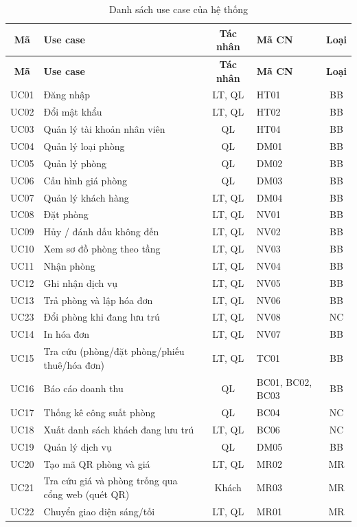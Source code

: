 \documentclass[14pt]{report}
\begin{document}
\begin{longtable}{|c|p{4.3cm}|c|l|c|}
\caption{Danh sách use case của hệ thống}\label{tab:uc-list}\\
\hline
\textbf{Mã} & \textbf{Use case} & \textbf{Tác nhân} & \textbf{Mã CN} & \textbf{Loại}\\\hline
\endfirsthead
\hline \textbf{Mã} & \textbf{Use case} & \textbf{Tác nhân} & \textbf{Mã CN} & \textbf{Loại}\\\hline
\endhead
UC01 & Đăng nhập & LT, QL & HT01 & BB \\\hline
UC02 & Đổi mật khẩu & LT, QL & HT02 & BB \\\hline
UC03 & Quản lý tài khoản nhân viên & QL & HT04 & BB \\\hline
UC04 & Quản lý loại phòng & QL & DM01 & BB \\\hline
UC05 & Quản lý phòng & QL & DM02 & BB \\\hline
UC06 & Cấu hình giá phòng & QL & DM03 & BB \\\hline
UC07 & Quản lý khách hàng & LT, QL & DM04 & BB \\\hline
UC08 & Đặt phòng & LT, QL & NV01 & BB \\\hline
UC09 & Hủy / đánh dấu không đến & LT, QL & NV02 & BB \\\hline
UC10 & Xem sơ đồ phòng theo tầng & LT, QL & NV03 & BB \\\hline
UC11 & Nhận phòng & LT, QL & NV04 & BB \\\hline
UC12 & Ghi nhận dịch vụ & LT, QL & NV05 & BB \\\hline
UC13 & Trả phòng và lập hóa đơn & LT, QL & NV06 & BB \\\hline
UC23 & Đổi phòng khi đang lưu trú & LT, QL & NV08 & NC \\\hline
UC14 & In hóa đơn & LT, QL & NV07 & BB \\\hline
UC15 & Tra cứu (phòng/đặt phòng/phiếu thuê/hóa đơn) & LT, QL & TC01 & BB \\\hline
UC16 & Báo cáo doanh thu & QL & BC01, BC02, BC03 & BB \\\hline
UC17 & Thống kê công suất phòng & QL & BC04 & NC \\\hline
UC18 & Xuất danh sách khách đang lưu trú & LT, QL & BC06 & NC \\\hline
UC19 & Quản lý dịch vụ & QL & DM05 & BB \\\hline
UC20 & Tạo mã QR phòng và giá & LT, QL & MR02 & MR \\\hline
UC21 & Tra cứu giá và phòng trống qua cổng web (quét QR) & Khách & MR03 & MR \\\hline
UC22 & Chuyển giao diện sáng/tối & LT, QL & MR01 & MR \\\hline
\end{longtable}
\end{document}
